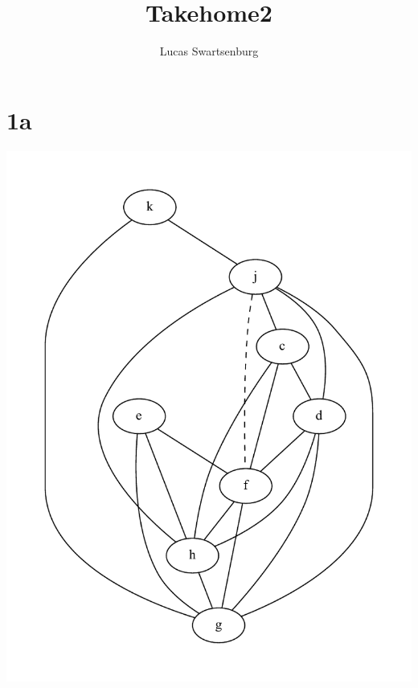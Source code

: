 \documentclass[10pt,a4paper]{article}
\author{Lucas Swartsenburg}
\title{Takehome2}
\begin{document}
\maketitle
\section*{1a}
\includegraphics[scale=0.8]{interference.pdf} 
\end{document}
